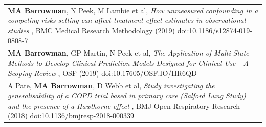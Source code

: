 \documentclass[
]{article}
\begin{document}
\begin{table}[H]
\centering\begingroup\fontsize{8}{10}\selectfont

\begin{tabular}{>{\raggedright\arraybackslash}p{\textwidth}}
\toprule
\textbf{MA Barrowman}, N Peek, M Lambie et al, \emph{ How unmeasured confounding in a competing risks setting can affect treatment effect estimates in observational studies }, BMC Medical Research Methodology (2019) doi:10.1186/s12874-019-0808-7\\
\textbf{MA Barrowman}, GP Martin, N Peek et al, \emph{ The Application of Multi-State Methods to Develop Clinical Prediction Models Designed for Clinical Use - A Scoping Review }, OSF (2019) doi:10.17605/OSF.IO/HR6QD\\
A Pate, \textbf{MA Barrowman}, D Webb et al, \emph{ Study investigating the generalisability of a COPD trial based in primary care (Salford Lung Study) and the presence of a Hawthorne effect }, BMJ Open Respiratory Research (2018) doi:10.1136/bmjresp-2018-000339\\
\bottomrule
\end{tabular}
\endgroup{}
\end{table}
\end{document}
